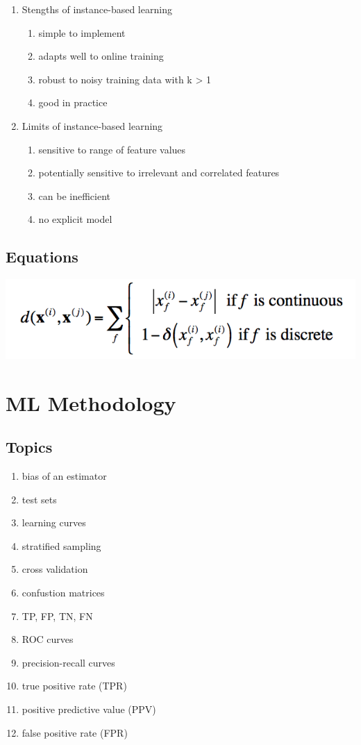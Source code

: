 \documentclass[a4paper]{article}
\begin{document}
\begin{enumerate}
\item Stengths of instance-based learning
  \begin{enumerate}
  \item simple to implement
  \item adapts well to online training
  \item robust to noisy training data with k > 1
  \item good in practice
  \end{enumerate}
\item Limits of instance-based learning
  \begin{enumerate}
  \item sensitive to range of feature values
  \item potentially sensitive to irrelevant and correlated features
  \item can be inefficient
  \item no explicit model
  \end{enumerate}
  
\end{enumerate}

\subsection{Equations}

\includegraphics{dist}

\section{ML Methodology}
\subsection{Topics}
\begin{enumerate}
\item bias of an estimator
\item test sets
\item learning curves
\item stratified sampling
\item cross validation
\item confustion matrices
\item TP, FP, TN, FN
\item ROC curves
\item precision-recall curves
\item true positive rate (TPR)
\item positive predictive value (PPV)
\item false positive rate (FPR)
\end{enumerate}
\end{document}
